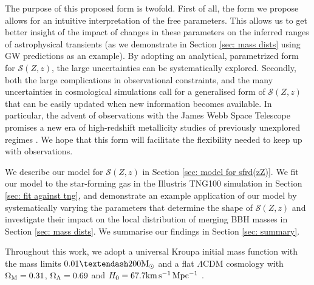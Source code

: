\documentclass[twocolumn]{aastex631}
\newcommand{\Msun}{\ensuremath{\rm{M}_{\odot}}\xspace}
\newcommand{\SFRDzZ}{\ensuremath{\mathcal{S}(Z,z)}\xspace}
\begin{document}
The purpose of this proposed form is twofold.  
First of all, the form we propose allows for an intuitive interpretation of the free parameters. This allows us to get better insight of the impact of changes in these parameters on the inferred ranges of astrophysical transients (as we demonstrate in Section \ref{sec: mass dists} using GW predictions as an example). By adopting an analytical, parametrized form for \SFRDzZ, the large uncertainties can be systematically explored.
%
Secondly, both the large complications in observational constraints, and the many uncertainties in cosmological simulations call for a generalised form of \SFRDzZ that can be easily updated when new information becomes available. %
In particular, the advent of observations with the James Webb Space Telescope promises a new era of high-redshift
metallicity studies of previously unexplored regimes \citep[e.g.,][]{Sanders+2022}. We hope that this form will facilitate the flexibility needed to keep up with observations. 



We describe our model for \SFRDzZ in Section \ref{sec: model for sfrd(zZ)}.
We fit our model to the star-forming gas in the Illustris TNG100 simulation in Section \ref{sec: fit against tng}, and demonstrate an example application of our model by systematically varying the parameters that determine the shape of \SFRDzZ and investigate their impact on the local distribution of merging BBH masses in Section \ref{sec: mass dists}.
We summarise our findings in Section \ref{sec: summary}.

Throughout this work, we adopt a universal Kroupa initial mass function \citep{Kroupa2001} with the mass
limits $0.01–200\Msun$ and a flat $\Lambda$CDM cosmology with $\Omega_{\rm{M}}=0.31$, $\Omega_{\rm{\Lambda}}=0.69$ and $H_0=67.7\rm{km\,s^{-1}\,Mpc^{-1}}$ \citep{Planck18_VI}.
\end{document}
